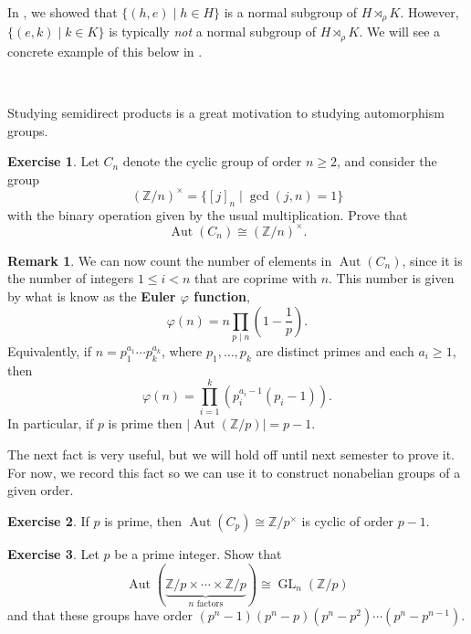 \documentclass[12pt]{report}
\numberwithin{equation}{section}
\numberwithin{theorem}{chapter}
\theoremstyle{definition}
\newtheorem{exercise}{Exercise}
\newtheorem*{basic properties}{Basic Properties}
\newtheorem*{Important Remark}{Important Remark}
\newtheorem{remark}[theorem]{Remark}
\newcommand{\df}[1]{{\bf #1}\index{#1}}
\DeclareMathOperator{\GL}{GL}
\newcommand{\Z}{\mathbb{Z}}
\def\sdp{\rtimes}
\DeclareMathOperator{\Aut}{Aut}
\begin{document}
\vspace{0.5em}

In , we showed that $\{(h,e)\mid h \in H\}$ is a normal subgroup of $H \sdp_\rho K$.
However, $\{(e,k)\mid k\in K\}$ is typically {\em not} a normal subgroup of $H \sdp_\rho K$. We will see a concrete example of this below in .

\




Studying semidirect products is a great motivation to studying automorphism groups.


\begin{exercise}\label{aut Cn}
Let $C_n$ denote the cyclic group of order $n \geqslant 2$, and consider the group
$$(\Z/n)^\times = \{ [j]_n \mid \gcd(j,n)=1\}$$
with the binary operation given by the usual multiplication. Prove that 
$$\Aut(C_n) \cong (\Z/n)^\times.$$
\end{exercise}



\begin{remark}
We can now count the number of elements in $\Aut(C_n)$, since it is the number of integers $1 \leqslant i <n$ that are coprime with $n$. This number is given by what is know as the \df{Euler $\varphi$ function}, 
$$\varphi(n) = n \prod_{p \mid n} \left( 1 - \frac{1}{p} \right).$$
Equivalently, if $n = p_1^{a_1} \cdots p_k^{a_k}$, where $p_1, \ldots, p_k$ are distinct primes and each $a_i \geqslant 1$, then
$$\varphi(n) = \prod_{i=1}^k \left( p_i^{a_i-1} (p_i - 1) \right).$$
In particular, if $p$ is prime then $| \Aut(\Z/p) | = p-1$.
\end{remark}


The next fact is very useful, but we will hold off until next semester to prove it. For now, we record this fact so we can use it to construct nonabelian groups of a given order.


\begin{exercise}\label{aut Cp cyclic of order p-1}
If $p$ is prime, then $\Aut(C_p) \cong \Z/p^\times$ is cyclic of order $p-1$. 
\end{exercise}

\begin{exercise}
Let $p$ be a prime integer. Show that
$$\Aut(\underbrace{\Z/p\times \cdots\times\Z/p}_{n \text{ factors}})\cong \GL_n(\Z/p)$$ 
and that these groups have order $(p^n-1)(p^n-p)(p^n-p^2)\cdots(p^n-p^{n-1})$.
\end{exercise}
\end{document}
